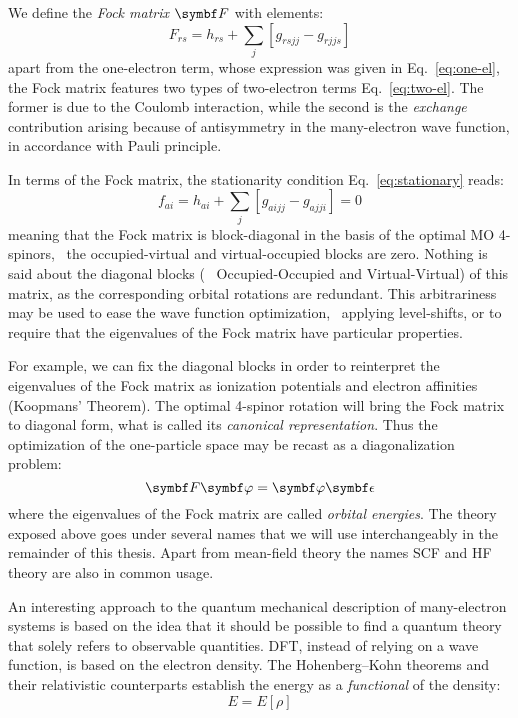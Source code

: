 We define the \emph{Fock matrix} $\mat{F}$ with elements:
\begin{equation}
  F_{rs} = h_{rs} + \sum_{j} [g_{rsjj} - g_{rjjs}]
\end{equation}
apart from the one-electron term, whose expression was given in Eq.~\eqref{eq:one-el},
the Fock matrix features two types of two-electron
terms Eq.~\eqref{eq:two-el}.
The former is due to the Coulomb interaction, while the second is the
\emph{exchange} contribution arising because of antisymmetry in the
many-electron wave function, in accordance with Pauli principle.

In terms of the Fock matrix, the stationarity condition Eq.~\eqref{eq:stationary} reads:
\begin{equation}
  f_{ai} = h_{ai} + \sum_{j}[g_{aijj} - g_{ajji}] = 0
\end{equation}
meaning that the Fock matrix is block-diagonal in the basis of the
optimal MO 4-spinors, \ie~the occupied-virtual and virtual-occupied
blocks are zero. Nothing is said about the diagonal blocks (\ie~
Occupied-Occupied and Virtual-Virtual) of this matrix, as the
corresponding orbital rotations are redundant. This arbitrariness may be
used to ease the wave function optimization, \eg~applying level-shifts,
or to require that the eigenvalues of the Fock matrix have particular
properties.\autocite{Szabo1989-vl, McWeeny1992-oj, Helgaker2000-tz}

For example, we can fix the diagonal blocks in order to reinterpret the
eigenvalues of the Fock matrix as ionization potentials and electron
affinities (Koopmans' Theorem).
The optimal 4-spinor rotation will bring the Fock matrix to diagonal
form, what is called its \emph{canonical representation}. Thus the
optimization of the one-particle space may be recast as a
diagonalization problem:
\begin{equation}\label{eq:fock-eq}
 \mat{F}\vect{\varphi} = \vect{\varphi}\mat{\epsilon}
\end{equation}
where the eigenvalues of the Fock matrix are called \emph{orbital
energies}. The theory exposed above goes under several names that we
will use interchangeably in the remainder of this thesis. Apart from
mean-field theory the names \gls{SCF} and
\gls{HF} theory are also in common usage.

An interesting approach to the quantum mechanical description of
many-electron systems is based on the idea that it should be possible to
find a quantum theory that solely refers to observable quantities.
\gls{DFT}, instead of relying on a wave
function, is based on the electron density.
The Hohenberg--Kohn theorems\autocite{Hohenberg1964-wo, Eschrig2012-as}
and their relativistic counterparts\autocite{Rajagopal1973-ns,
Dreizler2012-ay} establish the energy as a \emph{functional} of the
density:
\begin{equation}
 E = E[\rho]
\end{equation}

